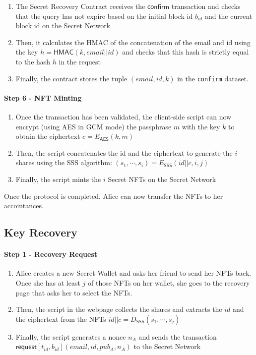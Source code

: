 \documentclass[12pt]{article}
\newcommand{\ms}[1]{\ensuremath{\mathsf{#1}}}
\newcommand{\tx}[3]{\ms{#1}[#2](#3)}
\begin{document}
\begin{enumerate}[label=5.\arabic*]
  \item The Secret Recovery Contract receives the $\ms{confirm}$ transaction and checks that the query has not expire based on the initial block id $b_{id}$ and the current block id on the Secret Network
  \item Then, it calculates the HMAC of the concatenation of the email and id using the key $h=\ms{HMAC}(k, email || id)$ and checks that this hash is strictly equal to the hash $h$ in the request
  \item Finally, the contract stores the tuple $(email, id, k)$ in the {\tt confirm} dataset.
\end{enumerate}

\paragraph{Step 6 - NFT Minting}

\begin{enumerate}[label=6.\arabic*]
  \item Once the transaction has been validated, the client-side script can now encrypt (using AES in GCM mode) the passphrase $m$ with the key $k$ to obtain the ciphertext $c=E_{\ms{AES}}(k, m)$
  \item Then, the script concatenates the id and the ciphertext to generate the $i$ shares using the SSS algorithm: $(s_1,\cdots,s_i)=E_{\ms{SSS}}(id||c, i, j)$
  \item Finally, the script mints the $i$ Secret NFTs on the Secret Network
\end{enumerate}

Once the protocol is completed, Alice can now transfer the NFTs to her accointances. 

\subsection{Key Recovery}

\paragraph{Step 1 - Recovery Request}

\begin{enumerate}[label=1.\arabic*]
    \item Alice creates a new Secret Wallet and asks her friend to send her NFTs back. Once she has at least $j$ of those NFTs on her wallet, she goes to the recovery page that asks her to select the NFTs.
    \item Then, the script in the webpage collects the shares and extracts the $id$ and the ciphertext from the NFTs $id||c = D_{\ms{SSS}}(s_1,\cdots,s_j)$
    \item Finally, the script generates a nonce $n_A$ and sends the transaction $\tx{request}{t_{id}, b_{id}}{email, id, pub_A, n_A}$ to the Secret Network
\end{enumerate}
\end{document}
